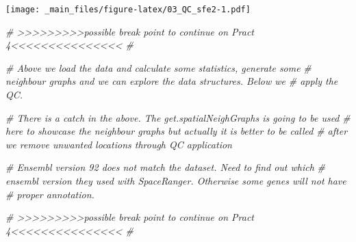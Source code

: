 \documentclass[
]{book}
\newenvironment{Shaded}{\begin{snugshade}}{\end{snugshade}}
\newcommand{\AttributeTok}[1]{\textcolor[rgb]{0.13,0.29,0.53}{#1}}
\newcommand{\CommentTok}[1]{\textcolor[rgb]{0.56,0.35,0.01}{\textit{#1}}}
\newcommand{\FunctionTok}[1]{\textcolor[rgb]{0.13,0.29,0.53}{\textbf{#1}}}
\newcommand{\NormalTok}[1]{#1}
\newcommand{\SpecialCharTok}[1]{\textcolor[rgb]{0.81,0.36,0.00}{\textbf{#1}}}
\newcommand{\StringTok}[1]{\textcolor[rgb]{0.31,0.60,0.02}{#1}}
\begin{document}
\begin{Shaded}
\end{Shaded}

\texttt{[image: \_main\_files/figure-latex/03\_QC\_sfe2-1.pdf]}

\begin{Shaded}
\begin{Highlighting}[]
\CommentTok{\# \textgreater{}\textgreater{}\textgreater{}\textgreater{}\textgreater{}\textgreater{}\textgreater{}\textgreater{}\textgreater{}possible break point to continue on Pract 4\textless{}\textless{}\textless{}\textless{}\textless{}\textless{}\textless{}\textless{}\textless{}\textless{}\textless{}\textless{}\textless{}\textless{}\textless{} \#}

\CommentTok{\# Above we load the data and calculate some statistics, generate some }
\CommentTok{\# neighbour graphs and we can explore the data structures. Below we }
\CommentTok{\# apply the QC.}

\CommentTok{\# There is a catch in the above. The get.spatialNeighGraphs is going to be used}
\CommentTok{\# here to showcase the neighbour graphs but actually it is better to be called }
\CommentTok{\# after we remove unwanted locations through QC application}

\CommentTok{\# Ensembl version 92 does not match the dataset. Need to find out which}
\CommentTok{\# ensembl version they used with SpaceRanger. Otherwise some genes will not have}
\CommentTok{\# proper annotation.}

\CommentTok{\# \textgreater{}\textgreater{}\textgreater{}\textgreater{}\textgreater{}\textgreater{}\textgreater{}\textgreater{}\textgreater{}possible break point to continue on Pract 4\textless{}\textless{}\textless{}\textless{}\textless{}\textless{}\textless{}\textless{}\textless{}\textless{}\textless{}\textless{}\textless{}\textless{}\textless{} \#}
\end{Highlighting}
\end{Shaded}
\end{document}
